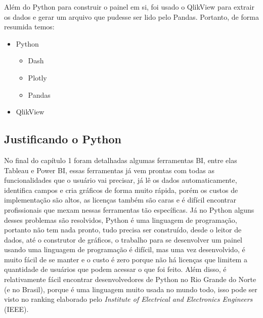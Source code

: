 Além do Python para construir o painel em si, foi usado o QlikView para extrair os dados e gerar um arquivo que pudesse ser lido pelo Pandas. Portanto, de forma resumida temos:

\begin{itemize}
	\item Python
	\begin{itemize}
		\item Dash
		\item Plotly
		\item Pandas
	\end{itemize}
	\item QlikView
\end{itemize}

\subsection{Justificando o Python}

No final do capítulo 1 foram detalhadas algumas ferramentas BI, entre elas Tableau e Power BI, essas ferramentas já vem prontas com todas as funcionalidades que o usuário vai precisar, já lê os dados automaticamente, identifica campos e cria gráficos de forma muito rápida, porém os custos de implementação são altos, as licenças também são caras e é difícil encontrar profissionais que mexam nessas ferramentas tão específicas. Já no Python alguns desses problemas são resolvidos, Python é uma linguagem de programação, portanto não tem nada pronto, tudo precisa ser construído, desde o leitor de dados, até o construtor de gráficos, o trabalho para se desenvolver um painel usando uma linguagem de programação é difícil, mas uma vez desenvolvido, é muito fácil de se manter e o custo é zero porque não há licenças que limitem a quantidade de usuários que podem acessar o que foi feito. Além disso, é relativamente fácil encontrar desenvolvedores de Python no Rio Grande do Norte (e no Brasil), porque é uma linguagem muito usada no mundo todo, isso pode ser visto no ranking elaborado pelo \textit{Institute of Electrical and Electronics Engineers} (IEEE).

